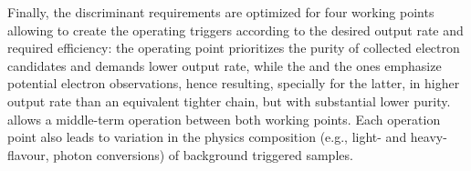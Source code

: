 Finally, the discriminant requirements are optimized for four working points
allowing to create the operating triggers according to the desired output rate
and required efficiency: the \tight{} operating point prioritizes the purity of
collected electron candidates and demands lower output rate, while the \loose{}
and the \vloose{} ones emphasize potential electron observations, hence
resulting, specially for the latter, in higher output rate than an equivalent
tighter chain, but with substantial lower purity.  \medium{} allows a middle-term
operation between both working points. Each operation point also leads to
variation in the physics composition (e.g., light- and heavy-flavour, photon
conversions) of background triggered samples. 


